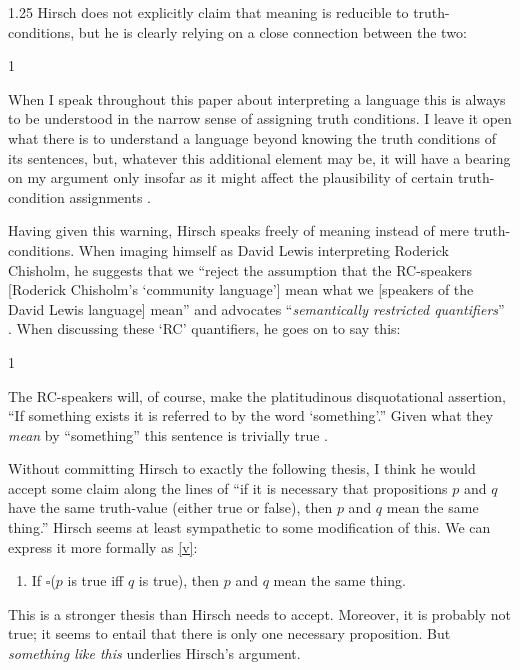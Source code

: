 \documentclass[11pt]{article}
\newenvironment{squote}{%
\begin{spacing}{1}
       	\begin{list}{}{%
\setlength{\labelwidth}{0pt}%
\rightmargin\leftmargin%
}
\item\relax
}{%
\end{list}%
\end{spacing}
}
\begin{document}
\begin{spacing}{1.25}
Hirsch does not explicitly claim that meaning is reducible to
truth-conditions, but he is clearly relying on a close connection
between the two:

\begin{squote}
When I speak throughout this paper about interpreting a language this
is always to be understood in the narrow sense of assigning truth
conditions.  I leave it open what there is to understand a language
beyond knowing the truth conditions of its sentences, but, whatever
this additional element may be, it will have a bearing on my argument
only insofar as it might affect the plausibility of certain
truth-condition assignments \citeyearpar[72]{hirsch2005}.
\end{squote}

Having given this warning, Hirsch speaks freely of meaning instead of
mere truth-conditions.  When imaging himself as David Lewis
interpreting Roderick Chisholm, he suggests that we ``reject the
assumption that the RC-speakers [Roderick Chisholm's `community
  language'] mean what we [speakers of the David Lewis language]
mean'' \citeyearpar[76]{hirsch2005} and advocates ``{\em semantically
  restricted quantifiers}'' \citeyearpar[76, his
  emphasis]{hirsch2005}.  When discussing these `RC' quantifiers, he
goes on to say this:

\begin{squote}
The RC-speakers will, of course, make the platitudinous disquotational
assertion, ``If something exists it is referred to by the word
`something'.''  Given what they {\em mean} by ``something'' this
sentence is trivially true \citeyearpar[77, my emphasis]{hirsch2005}.
\end{squote}

Without committing Hirsch to exactly the following thesis, I think he
would accept some claim along the lines of ``if it is necessary that
propositions $p$ and $q$ have the same truth-value (either true or
false), then $p$ and $q$ mean the same thing.''  Hirsch seems at least
sympathetic to some modification of this.  We can express it more
formally as \ref{v}:
\begin{enumerate}[itemindent=25pt, label=(V)]
    \item If $\square$($p$ is true iff $q$ is true), then $p$ and $q$ mean
    the same thing. \label{v}
\end{enumerate}

This is a stronger thesis than Hirsch needs to accept.  Moreover, it
is probably not true; it seems to entail that there is only one
necessary proposition.  But {\em something like this} underlies
Hirsch's argument.


\end{spacing}
\end{document}
